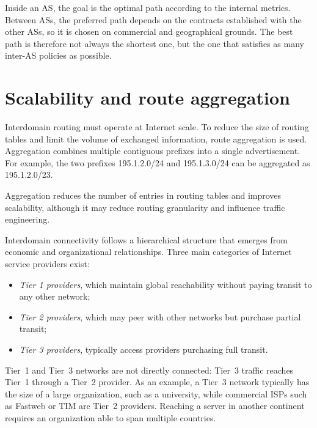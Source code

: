 Inside an AS, the goal is the optimal path according to the internal metrics.
Between ASs, the preferred path depends on the contracts established with the
other ASs, so it is chosen on commercial and geographical grounds. The best path
is therefore not always the shortest one, but the one that satisfies as many
inter-AS policies as possible.

\section{Scalability and route aggregation}

Interdomain routing must operate at Internet scale. To reduce the size of routing tables and limit the volume of exchanged information, route aggregation is used. Aggregation combines multiple contiguous prefixes into a single advertisement. For example, the two prefixes 195.1.2.0/24 and 195.1.3.0/24 can be aggregated as 195.1.2.0/23.

Aggregation reduces the number of entries in routing tables and improves scalability, although it may reduce routing granularity and influence traffic engineering.

Interdomain connectivity follows a hierarchical structure that emerges from economic and organizational relationships. Three main categories of Internet service providers exist:

\begin{center}
\end{center}

\begin{itemize}
\item \emph{Tier 1 providers}, which maintain global reachability without paying transit to any other network;
\item \emph{Tier 2 providers}, which may peer with other networks but purchase partial transit;
\item \emph{Tier 3 providers}, typically access providers purchasing full transit.
\end{itemize}

Tier~1 and Tier~3 networks are not directly connected: Tier~3 traffic reaches
Tier~1 through a Tier~2 provider. As an example, a Tier~3 network typically has
the size of a large organization, such as a university, while commercial ISPs
such as Fastweb or TIM are Tier~2 providers. Reaching a server in another
continent requires an organization able to span multiple countries.


